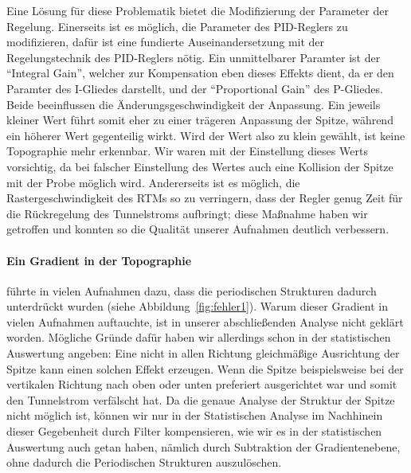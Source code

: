 Eine Lösung für diese Problematik bietet die Modifizierung der Parameter der Regelung. 
Einerseits ist es möglich, die Parameter des PID-Reglers zu modifizieren, dafür
ist eine fundierte Auseinandersetzung mit der Regelungstechnik des PID-Reglers nötig.
Ein unmittelbarer Paramter ist der ``Integral Gain'', welcher zur Kompensation eben dieses
Effekts dient, da er den Paramter des I-Gliedes darstellt,
und der ``Proportional Gain'' des P-Gliedes. Beide beeinflussen die Änderungsgeschwindigkeit
der Anpassung. Ein jeweils kleiner Wert führt somit eher zu einer trägeren Anpassung
der Spitze, während ein höherer Wert gegenteilig wirkt. Wird der Wert also zu klein gewählt,
ist keine Topographie mehr erkennbar. Wir waren mit der Einstellung dieses Werts vorsichtig,
da bei falscher Einstellung des Wertes auch eine Kollision der Spitze mit der Probe möglich wird.
Andererseits ist es möglich, die Rastergeschwindigkeit des RTMs so zu verringern, dass der
Regler genug Zeit für die Rückregelung des Tunnelstroms aufbringt; diese Maßnahme haben wir 
getroffen und konnten so die Qualität unserer Aufnahmen deutlich verbessern.
\paragraph{Ein Gradient in der Topographie} führte in vielen Aufnahmen
dazu, dass die periodischen Strukturen dadurch unterdrückt wurden (siehe Abbildung~\ref{fig:fehler1}).
Warum dieser Gradient in vielen Aufnahmen auftauchte, ist in unserer abschließenden Analyse
nicht geklärt worden. Mögliche Gründe dafür haben wir allerdings schon in der statistischen Auswertung
angeben: Eine nicht in allen Richtung gleichmäßige Ausrichtung der Spitze kann einen solchen
Effekt erzeugen. Wenn die Spitze beispielsweise 
bei der vertikalen Richtung nach oben oder unten preferiert ausgerichtet
war und somit den Tunnelstrom verfälscht hat.
Da die genaue Analyse der Struktur der Spitze nicht möglich ist, können wir nur in der 
Statistischen Analyse im Nachhinein dieser Gegebenheit durch Filter kompensieren, wie wir es
in der statistischen Auswertung auch getan haben, nämlich durch Subtraktion der Gradientenebene,
ohne dadurch die Periodischen Strukturen auszulöschen.
